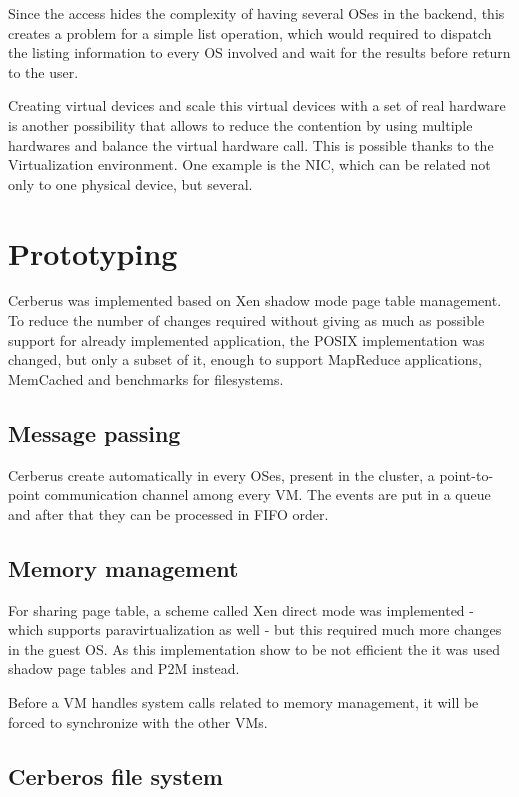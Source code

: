\documentclass[journal]{IEEEtran}
\begin{document}
\begin{itemize}
	Since the access hides the complexity of having several OSes in the backend, this creates a problem for a simple list operation, which would required to dispatch the listing information to every OS involved and wait for the results before return to the user.
	
	Creating virtual devices and scale this virtual devices with a set of real hardware is another possibility that allows to reduce the contention by using multiple hardwares and balance the virtual hardware call. This is possible thanks to the Virtualization environment. One example is the NIC, which can be related not only to one physical device, but several. 
	
	\section{Prototyping}
	
	Cerberus was implemented based on Xen shadow mode page table management. To reduce the number of changes required without giving as much as possible support for already implemented application, the POSIX implementation was changed, but only a subset of it, enough to support MapReduce applications, MemCached and benchmarks for filesystems.
	
	\subsection{Message passing}
	
	Cerberus create automatically in every OSes, present in the cluster, a point-to-point communication channel among every VM. The events are put in a queue and after that they can be processed in FIFO order.
	
	
	\subsection{Memory management}
	
	For sharing page table, a scheme called Xen direct mode was implemented - which supports paravirtualization as well - but this required much more changes in the guest OS. As this implementation show to be not efficient the it was used shadow page tables and P2M instead.
	
	Before a VM handles system calls related to memory management, it will be forced to synchronize with the other VMs.
	
	\subsection{Cerberos file system}
	

\end{itemize}
\end{document}

